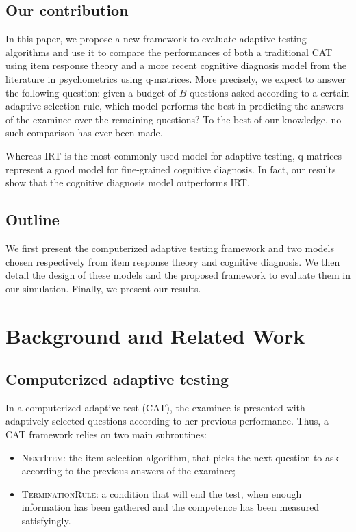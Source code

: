 \documentclass{sig-alternate}
\begin{document}
\subsection{Our contribution}

In this paper, we propose a new framework to evaluate adaptive testing algorithms and use it to compare the performances of both a traditional CAT using item response theory and a more recent cognitive diagnosis model from the literature in psychometrics using q-matrices. More precisely, we expect to answer the following question: given a budget of $B$ questions asked according to a certain adaptive selection rule, which model performs the best in predicting the answers of the examinee over the remaining questions? To the best of our knowledge, no such comparison has ever been made.

Whereas IRT is the most commonly used model for adaptive testing, q-matrices represent a good model for fine-grained cognitive diagnosis. In fact, our results show that the cognitive diagnosis model outperforms IRT.

\subsection{Outline}

We first present the computerized adaptive testing framework and two models chosen respectively from item response theory and cognitive diagnosis. We then detail the design of these models and the proposed framework to evaluate them in our simulation. Finally, we present our results.

\section{Background and Related Work}

\subsection{Computerized adaptive testing}

In a computerized adaptive test (CAT), the examinee is presented with adaptively selected questions according to her previous performance. Thus, a CAT framework relies on two main subroutines:
\begin{itemize}
\item \textsc{NextItem}: the item selection algorithm, that picks the next question to ask according to the previous answers of the examinee;
\item \textsc{TerminationRule}: a condition that will end the test, when enough information has been gathered and the competence has been measured satisfyingly.
\end{itemize}
\end{document}
